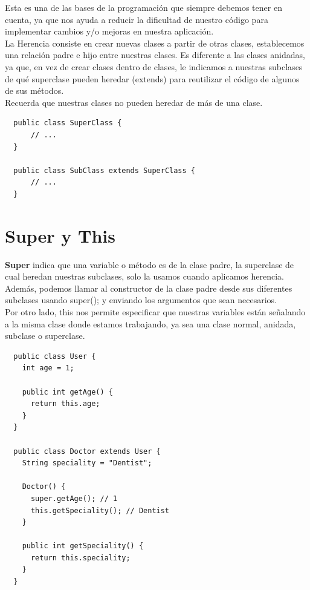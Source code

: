 \documentclass{article}
\begin{document}
Esta es una de las bases de la programación que siempre debemos tener en
cuenta, ya que nos ayuda a reducir la dificultad de nuestro código para
implementar cambios y/o mejoras en nuestra aplicación.\\

La Herencia consiste en crear nuevas clases a partir de otras clases,
establecemos una relación padre e hijo entre nuestras clases. Es diferente a
las clases anidadas, ya que, en vez de crear clases dentro de clases, le
indicamos a nuestras subclases de qué superclase pueden heredar (extends) para
reutilizar el código de algunos de sus métodos.\\

Recuerda que nuestras clases no pueden heredar de más de una clase.\\

\begin{verbatim}
  public class SuperClass {
      // ...
  }

  public class SubClass extends SuperClass {
      // ...
  }
\end{verbatim}


\section{Super y This}%
\textbf{Super} indica que una variable o método es de la clase padre, la
superclase de cual heredan nuestras subclases, solo la usamos cuando aplicamos
herencia.\\

Además, podemos llamar al constructor de la clase padre desde sus diferentes
subclases usando super(); y enviando los argumentos que sean necesarios.\\

Por otro lado, this nos permite especificar que nuestras variables están
señalando a la misma clase donde estamos trabajando, ya sea una clase normal,
anidada, subclase o superclase.\\

\begin{verbatim}
  public class User {
    int age = 1;

    public int getAge() {
      return this.age;
    }
  }

  public class Doctor extends User {
    String speciality = "Dentist";

    Doctor() {
      super.getAge(); // 1
      this.getSpeciality(); // Dentist
    }

    public int getSpeciality() {
      return this.speciality;
    }
  }
\end{verbatim}
\end{document}
